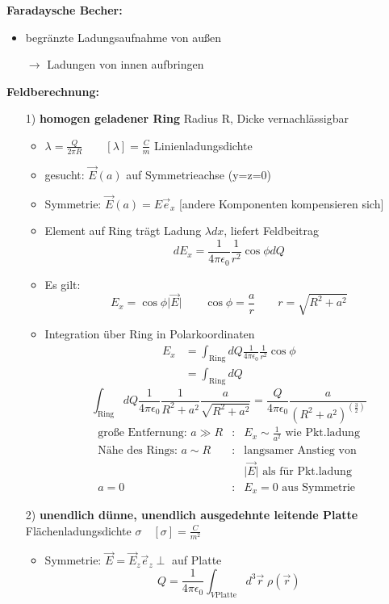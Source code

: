 \documentclass[titlepage,12pt,a4paper,ngerman]{report}
\newcommand{\tx}[1]{\textrm{#1}}
\begin{document}
\textbf{Faradaysche Becher:}
\begin{itemize}
\item begränzte Ladungsaufnahme von außen
\item[$\rightarrow$] Ladungen von innen aufbringen
\end{itemize}
\textbf{Feldberechnung:}
\begin{itemize}
\item[1)] \textbf{homogen geladener Ring} Radius R, Dicke vernachlässigbar
\begin{itemize}
\item $\lambda = \frac{Q}{2\pi R} \qquad [\lambda] = \frac{C}{m}$ Linienladungsdichte
\item gesucht: $\vec{E}(a)$ auf Symmetrieachse (y=z=0)
\item Symmetrie: $\vec{E}(a) = E \vec{e}_x$ [andere Komponenten kompensieren sich]
\item Element auf Ring trägt Ladung $\lambda dx$, liefert Feldbeitrag $$dE_x = \frac{1}{4\pi \epsilon_0} \frac{1}{r^2} \cos \phi dQ$$
\item Es gilt: $$E_x = \cos \phi \vert \vec{E} \vert \qquad \cos\phi = \frac{a}{r} \qquad r= \sqrt{R^2+a^2}$$
\item Integration über Ring in Polarkoordinaten 
\begin{align*}
E_x & = \int_{\tx{Ring}} dQ \frac{1}{4\pi\epsilon_0} \frac{1}{r^2} \cos \phi \\
& = \int_{\tx{Ring}}dQ 
\end{align*}
$$\int_{\tx{Ring}} dQ \frac{1}{4\pi\epsilon_0} \frac{1}{R^2+a^2}\frac{a}{\sqrt{R^2+a^2}} = \frac{Q}{4\pi\epsilon_0} \frac{a}{(R^2+a^2)^{(\frac{3}{2})}}$$
\begin{align*}
\textrm{große Entfernung: }  a\gg R &: & E_x \sim \frac{1}{a^2} \textrm{ wie Pkt.ladung}\\
\textrm{Nähe des Rings: }  a \sim R  &: & \textrm{langsamer Anstieg von }\\ & & \vert \vec{E} \vert \textrm{ als für Pkt.ladung}\\
 a=0&: &E_x = 0  \textrm{ aus Symmetrie }
\end{align*}
\end{itemize}
\item[2)] \textbf{unendlich dünne, unendlich ausgedehnte leitende Platte}\\ Flächenladungsdichte $\sigma \quad [\sigma] = \frac{C}{m^2}$
\begin{itemize}
\item Symmetrie: $\vec{E} = \vec{E}_z \vec{e}_z \perp $ auf Platte
$$Q = \frac{1}{4 \pi \epsilon_0} \int_{V \tx{Platte}} d^3 \vec{r}\; \rho ( \vec{r})$$


\end{itemize}
\end{itemize}
\end{document}
